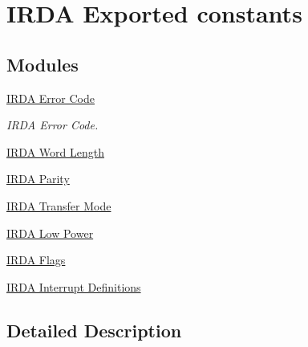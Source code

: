\hypertarget{group___i_r_d_a___exported___constants}{}\section{I\+R\+DA Exported constants}
\label{group___i_r_d_a___exported___constants}
\subsection*{Modules}
\begin{DoxyCompactItemize}
\item 
\hyperlink{group___i_r_d_a___error___code}{I\+R\+D\+A Error Code}
\begin{DoxyCompactList}\small\item\em I\+R\+DA Error Code. \end{DoxyCompactList}\item 
\hyperlink{group___i_r_d_a___word___length}{I\+R\+D\+A Word Length}
\item 
\hyperlink{group___i_r_d_a___parity}{I\+R\+D\+A Parity}
\item 
\hyperlink{group___i_r_d_a___mode}{I\+R\+D\+A Transfer Mode}
\item 
\hyperlink{group___i_r_d_a___low___power}{I\+R\+D\+A Low Power}
\item 
\hyperlink{group___i_r_d_a___flags}{I\+R\+D\+A Flags}
\item 
\hyperlink{group___i_r_d_a___interrupt__definition}{I\+R\+D\+A Interrupt Definitions}
\end{DoxyCompactItemize}


\subsection{Detailed Description}
